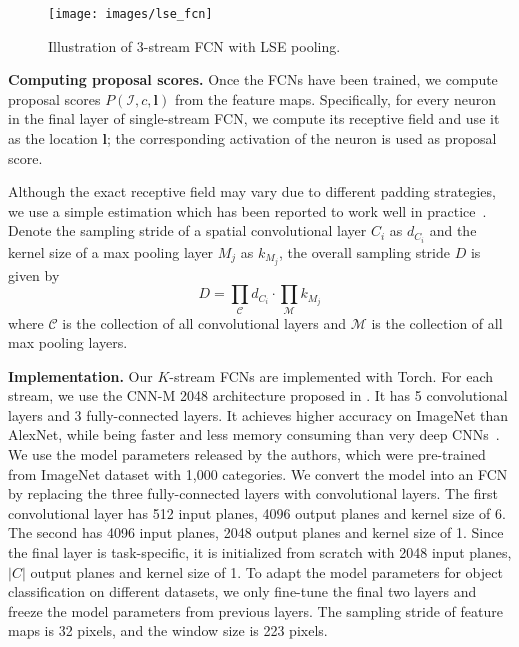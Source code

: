 \documentclass[10pt,twocolumn,letterpaper]{article}
\begin{document}
\begin{figure}
  \centering
    \texttt{[image: images/lse\_fcn]}
  \caption{Illustration of 3-stream FCN with LSE pooling.}
  \label{fig:lse}
\end{figure}


\textbf{Computing proposal scores.} Once the FCNs have been trained, we compute proposal scores $P(\mathcal{I}, c, \mathbf{l})$ from the feature maps. Specifically, for every neuron in the final layer of single-stream FCN, we compute its receptive field and use it as the location $\mathbf{l}$; the corresponding activation of the neuron is used as proposal score. 

Although the exact receptive field may vary due to different padding strategies, we use a simple estimation which has been reported to work well in practice~\cite{DBLP:journals/corr/SermanetEZMFL13}. Denote the sampling stride of a spatial convolutional layer $C_i$ as $d_{C_i}$ and the kernel size of a max pooling layer $M_j$ as $k_{M_j}$, the overall sampling stride $D$ is given by
\begin{equation}
D = \prod_{\mathcal{C}} d_{C_i} \cdot \prod_{\mathcal{M}} k_{M_j}
\end{equation}
where $\mathcal{C}$ is the collection of all convolutional layers and $\mathcal{M}$ is the collection of all max pooling layers.




\textbf{Implementation.} Our $K$-stream FCNs are implemented with Torch. For each stream, we use the CNN-M 2048 architecture proposed in \cite{DBLP:journals/corr/ChatfieldSVZ14}. It has 5 convolutional layers and 3 fully-connected layers. It achieves higher accuracy on ImageNet than AlexNet, while being faster and less memory consuming than very deep CNNs~\cite{Simonyan14c}. We use the model parameters released by the authors, which were pre-trained from ImageNet dataset with 1,000 categories. We convert the model into an FCN by replacing the three fully-connected layers with convolutional layers. The first convolutional layer has 512 input planes, 4096 output planes and kernel size of 6. The second has 4096 input planes, 2048 output planes and kernel size of 1. Since the final layer is task-specific, it is initialized from scratch with 2048 input planes, $|C|$ output planes and kernel size of 1. To adapt the model parameters for object classification on different datasets, we only fine-tune the final two layers and freeze the model parameters from previous layers. The sampling stride of feature maps is 32 pixels, and the  window size is 223 pixels.
\end{document}

